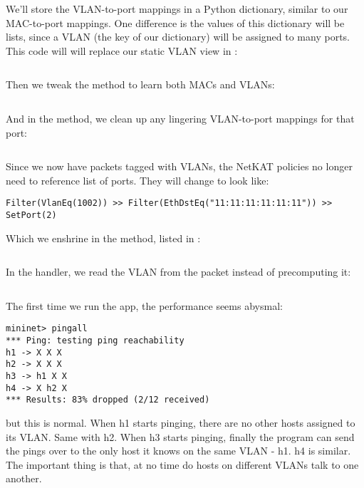 We'll store the VLAN-to-port mappings in a Python dictionary, similar to our MAC-to-port mappings.  
One difference is the values of this dictionary will be lists, since a VLAN (the key of our dictionary)
will be assigned to many ports.  This code will will replace our static VLAN view in 
:

\inputminted[firstline=65]{python}{code/handling_vlans/network_information_base_dynamic.py}

Then we tweak the  method to learn both MACs and VLANs:

\inputminted[firstline=13,lastline=24]{python}{code/handling_vlans/network_information_base_dynamic.py}

And in the  method, we clean up any lingering VLAN-to-port mappings for that port:

\inputminted[firstline=55,lastline=60]{python}{code/handling_vlans/network_information_base_dynamic.py}

Since we now have packets tagged with VLANs, the NetKAT policies no longer need to reference list of ports.
They will change to look like:

\begin{verbatim}
Filter(VlanEq(1002)) >> Filter(EthDstEq("11:11:11:11:11:11")) >> SetPort(2)
\end{verbatim}

Which we enshrine in the  method, listed in 
:

\inputminted[firstline=23,lastline=29]{python}{code/handling_vlans/vlan2.py}

In the  handler, we read the VLAN from the packet instead of precomputing it:

\inputminted[firstline=42,lastline=71]{python}{code/handling_vlans/vlan2.py}

The first time we run the app, the performance seems abysmal:

\begin{verbatim}
mininet> pingall
*** Ping: testing ping reachability
h1 -> X X X
h2 -> X X X
h3 -> h1 X X
h4 -> X h2 X
*** Results: 83% dropped (2/12 received)
\end{verbatim}

but this is normal.  When h1 starts pinging, there are no other hosts assigned to its VLAN.  
Same with h2.  When h3 starts pinging, finally the program can send the pings over to the only
host it knows on the same VLAN - h1.  h4 is similar.  The important thing is that, at no time do
hosts on different VLANs talk to one another.  

